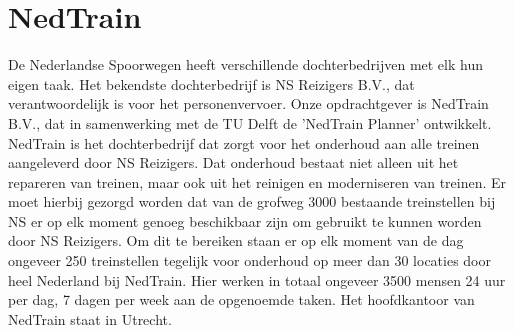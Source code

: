 \section{NedTrain}
De Nederlandse Spoorwegen heeft verschillende dochterbedrijven met elk hun eigen taak. Het bekendste dochterbedrijf is NS Reizigers B.V., dat verantwoordelijk is voor het personenvervoer. Onze opdrachtgever is NedTrain B.V., dat in samenwerking met de TU Delft de 'NedTrain Planner' ontwikkelt. NedTrain is het dochterbedrijf dat zorgt voor het onderhoud aan alle treinen aangeleverd door NS Reizigers. Dat onderhoud bestaat niet alleen uit het repareren van treinen, maar ook uit het reinigen en moderniseren van treinen. Er moet hierbij gezorgd worden dat van de grofweg 3000 bestaande treinstellen bij NS er op elk moment genoeg beschikbaar zijn om gebruikt te kunnen worden door NS Reizigers. Om dit te bereiken staan er op elk moment van de dag ongeveer 250 treinstellen tegelijk voor onderhoud op meer dan 30 locaties door heel Nederland bij NedTrain. Hier werken in totaal ongeveer 3500 mensen 24 uur per dag, 7 dagen per week aan de opgenoemde taken. Het hoofdkantoor van NedTrain staat in Utrecht.
